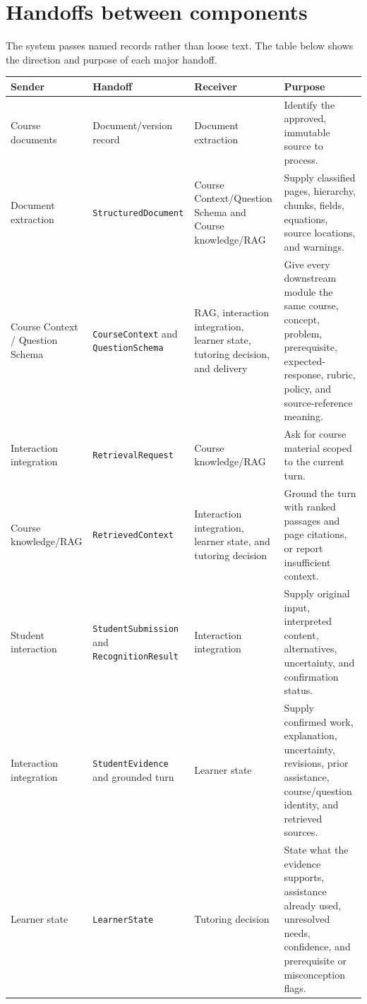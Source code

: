 \documentclass[11pt]{article}
\begin{document}
\section{Handoffs between components}

The system passes named records rather than loose text. The table below shows the direction and purpose of each major handoff.

\small
\noindent\begin{tabularx}{\textwidth}{@{}p{}p{}p{}X@{}}
\toprule
\textbf{Sender} & \textbf{Handoff} & \textbf{Receiver} & \textbf{Purpose} \\
\midrule
Course documents & Document/version record & Document extraction & Identify the approved, immutable source to process. \\
Document extraction & \texttt{StructuredDocument} & Course Context/Question Schema and Course knowledge/RAG & Supply classified pages, hierarchy, chunks, fields, equations, source locations, and warnings. \\
Course Context / Question Schema & \texttt{CourseContext} and \texttt{QuestionSchema} & RAG, interaction integration, learner state, tutoring decision, and delivery & Give every downstream module the same course, concept, problem, prerequisite, expected-response, rubric, policy, and source-reference meaning. \\
Interaction integration & \texttt{RetrievalRequest} & Course knowledge/RAG & Ask for course material scoped to the current turn. \\
Course knowledge/RAG & \texttt{RetrievedContext} & Interaction integration, learner state, and tutoring decision & Ground the turn with ranked passages and page citations, or report insufficient context. \\
Student interaction & \texttt{StudentSubmission} and \texttt{RecognitionResult} & Interaction integration & Supply original input, interpreted content, alternatives, uncertainty, and confirmation status. \\
Interaction integration & \texttt{StudentEvidence} and grounded turn & Learner state & Supply confirmed work, explanation, uncertainty, revisions, prior assistance, course/question identity, and retrieved sources. \\
Learner state & \texttt{LearnerState} & Tutoring decision & State what the evidence supports, assistance already used, unresolved needs, confidence, and prerequisite or misconception flags. \\

\end{tabularx}
\end{document}
